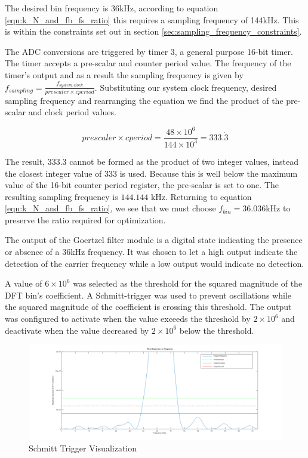 The desired bin frequency is 36kHz, according to equation \ref{eqn:k_N_and_fb_fs_ratio} this requires a sampling frequency of 144kHz. This is within the constraints set out in section \ref{sec:sampling_frequency_constraints}.

The ADC conversions are triggered by timer 3, a general purpose 16-bit timer. The timer accepts a pre-scalar and counter period value. The frequency of the timer's output and as a result the sampling frequency is given by \(f_{sampling} = \frac{f_{system\_clock}}{prescaler \times cperiod}\). Substituting our system clock frequency, desired sampling frequency and rearranging the equation we find the product of the pre-scalar and clock period values.

\[prescaler \times cperiod = \frac{48 \times 10^6}{144 \times 10^3} = 333.\dot{3}\]

The result, $333.\dot{3}$ cannot be formed as the product of two integer values, instead the closest integer value of 333 is used. Because this is well below the maximum value of the 16-bit counter period register, the pre-scalar is set to one. The resulting sampling frequency is $144.\dot{1}4\dot{4}$ kHz. Returning to equation \ref{eqn:k_N_and_fb_fs_ratio}, we see that we must choose $f_{bin} = 36.036$kHz to preserve the ratio required for optimization.

The output of the Goertzel filter module is a digital state indicating the presence or absence of a 36kHz frequency. It was chosen to let a high output indicate the detection of the carrier frequency while a low output would indicate no detection.

A value of $6\times 10^{6}$ was selected as the threshold for the squared magnitude of the DFT bin's coefficient. A Schmitt-trigger was used to prevent oscillations while the squared magnitude of the coefficient is crossing this threshold. The output was configured to activate when the value exceeds the threshold by $2\times 10^{6}$ and deactivate when the value decreased by $2\times 10^{6}$ below the threshold.

\begin{figure}[H]
	\centering
	\includegraphics[width=.8\textwidth]{figures/design/schmit_simulation_wide.png}
	\caption{Schmitt Trigger Visualization}
	\label{fig:schmit_simulation_wide}
\end{figure}

